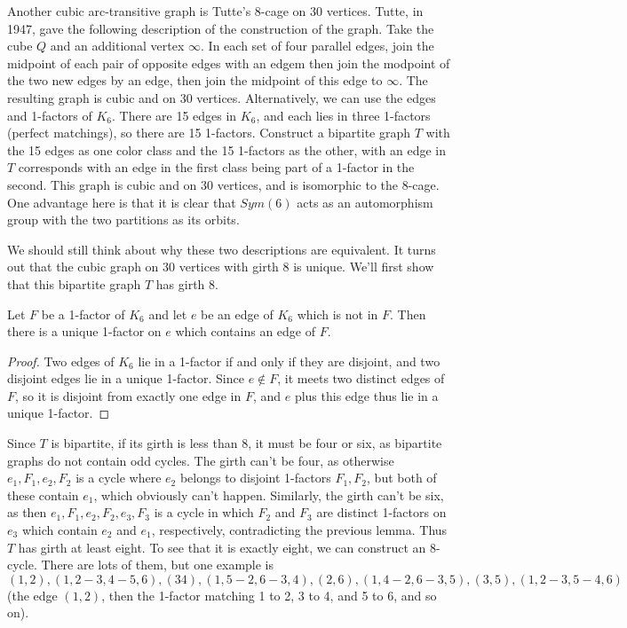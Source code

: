Another cubic arc-transitive graph is Tutte's 8-cage on 30 vertices.  Tutte, in 1947, gave the following description of the construction of the graph.  Take the cube $Q$ and an additional vertex $\infty$.  In each set of four parallel edges, join the midpoint of each pair of opposite edges with an edgem then join the modpoint of the two new edges by an edge, then join the midpoint of this edge to $\infty$.  The resulting graph is cubic and on 30 vertices.  Alternatively, we can use the edges and 1-factors of $K_6$.  There are 15 edges in $K_6$, and each lies in three 1-factors (perfect matchings), so there are 15 1-factors.  Construct a bipartite graph $T$ with the 15 edges as one color class and the 15 1-factors as the other, with an edge in $T$ corresponds with an edge in the first class being part of a 1-factor in the second.  This graph is cubic and on 30 vertices, and is isomorphic to the 8-cage.  One advantage here is that it is clear that $Sym(6)$ acts as an automorphism group with the two partitions as its orbits.

We should still think about why these two descriptions are equivalent.  It turns out that the cubic graph on 30 vertices with girth 8 is unique.  We'll first show that this bipartite graph $T$ has girth 8.

\begin{lemma}
	Let $F$ be a 1-factor of $K_6$ and let $e$ be an edge of $K_6$ which is not in $F$.  Then there is a unique 1-factor on $e$ which contains an edge of $F$.
\end{lemma}
\begin{proof}
	Two edges of $K_6$ lie in a 1-factor if and only if they are disjoint, and two disjoint edges lie in a unique 1-factor.  Since $e\notin F$, it meets two distinct edges of $F$, so it is disjoint from exactly one edge in $F$, and $e$ plus this edge thus lie in a unique 1-factor.
\end{proof}

Since $T$ is bipartite, if its girth is less than $8$, it must be four or six, as bipartite graphs do not contain odd cycles.  The girth can't be four, as otherwise $e_1,F_1,e_2,F_2$ is a cycle where $e_2$ belongs to disjoint 1-factors $F_1,F_2$, but both of these contain $e_1$, which obviously can't happen. Similarly, the girth can't be six, as then $e_1,F_1,e_2,F_2,e_3,F_3$ is a cycle in which $F_2$ and $F_3$ are distinct 1-factors on $e_3$ which contain $e_2$ and $e_1$, respectively, contradicting the previous lemma.  Thus $T$ has girth at least eight.  To see that it is exactly eight, we can construct an 8-cycle.  There are lots of them, but one example is $(1,2),(1,2{-}3,4{-}5,6),(34),(1,5{-}2,6{-}3,4),(2,6),(1,4{-}2,6{-}3,5),(3,5),(1,2{-}3,5{-}4,6)$ (the edge $(1,2)$, then the 1-factor matching 1 to 2, 3 to 4, and 5 to 6, and so on).

